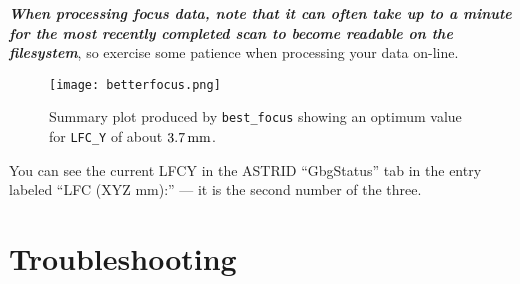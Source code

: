 {\bf \it When processing focus data, note that it can often take up to
a minute for the most recently completed scan to become readable on
the filesystem}, so exercise some patience when processing your data
on-line. 

\begin{figure}
\texttt{[image: betterfocus.png]}
\caption[Summary plot produced by best\_focus showing an optimum
value for LFC\_Y]
{Summary plot produced by {\tt best\_focus} showing an optimum
value for {\tt LFC\_Y} of about $3.7 \, {\rm mm}$.}
\label{fig:musfocus}
\end{figure}

You can see the current LFCY in the ASTRID ``GbgStatus'' tab in the
entry labeled ``LFC (XYZ mm):'' --- it is the second number of the
three.

\section{Troubleshooting}\label{sec:musproblems}

